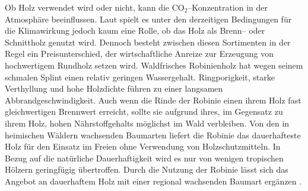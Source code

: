 \documentclass[twocolumn]{scrartcl}
\begin{document}
Ob Holz verwendet wird oder nicht, kann die CO$_2$--Konzentration in
der Atmosphäre beeinflussen. Laut
\citet{boiger2024schnittholzBrennholz} spielt es unter den derzeitigen
Bedingungen für die Klimawirkung jedoch kaum eine Rolle, ob das Holz
als Brenn-- oder Schnittholz genutzt wird. Dennoch besteht zwischen
diesen Sortimenten in der Regel ein Preisunterschied, der
wirtschaftliche Anreize zur Erzeugung von hochwertigem Rundholz setzen
wird. Waldfrisches Robinienholz hat wegen seinem schmalen Splint einen
relativ geringen Wassergehalt.  Ringporigkeit, starke Verthyllung und
hohe Holzdichte führen zu einer langsamen Abbrandgeschwindigkeit.
Auch wenn die Rinde der Robinie einen ihrem Holz fast gleichwertigen
Brennwert erreicht, sollte sie aufgrund ihres, im Gegensatz zu ihrem
Holz, hohen Nährstoffgehalts möglichst im Wald verbleiben. Von den in
heimischen Wäldern wachsenden Baumarten liefert die Robinie das
dauerhafteste Holz für den Einsatz im Freien ohne Verwendung von
Holzschutzmitteln. In Bezug auf die natürliche Dauerhaftigkeit wird es
nur von wenigen tropischen Hölzern geringfügig übertroffen. Durch die
Nutzung der Robinie lässt sich das Angebot an dauerhaftem Holz mit
einer regional wachsenden Baumart ergänzen
\citep{benthien2020robinieTropenholz}.
\end{document}
